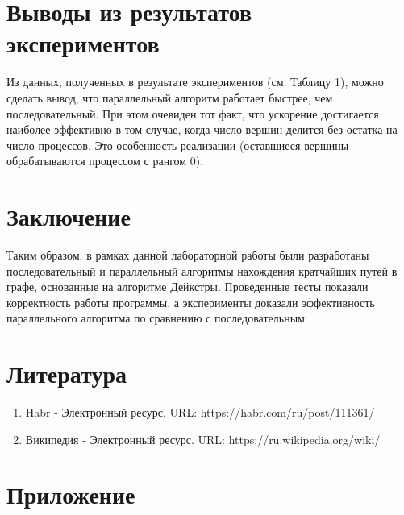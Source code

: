 \documentclass{report}
\begin{document}
\newpage

\section*{Выводы из результатов экспериментов}
\par Из данных, полученных в результате экспериментов (см. Таблицу 1), можно сделать вывод, что параллельный алгоритм работает быстрее, чем последовательный. При этом очевиден тот факт, что ускорение достигается наиболее эффективно в том случае, когда число вершин делится без остатка на число процессов. Это особенность реализации (оставшиеся вершины обрабатываются процессом с рангом 0).

\newpage

\section*{Заключение}
\par Таким образом, в рамках данной лабораторной работы были разработаны последовательный и параллельный алгоритмы нахождения кратчайших путей в графе, основанные на алгоритме Дейкстры. Проведенные тесты показали корректность работы программы, а эксперименты доказали эффективность параллельного алгоритма по сравнению с последовательным.

\newpage

\section*{Литература}
\begin{enumerate}
\item Habr - Электронный ресурс. URL: https://habr.com/ru/post/111361/
\item Википедия - Электронный ресурс. URL: https://ru.wikipedia.org/wiki/%
\end{enumerate} 
\newpage

\section*{Приложение}
\end{document}
